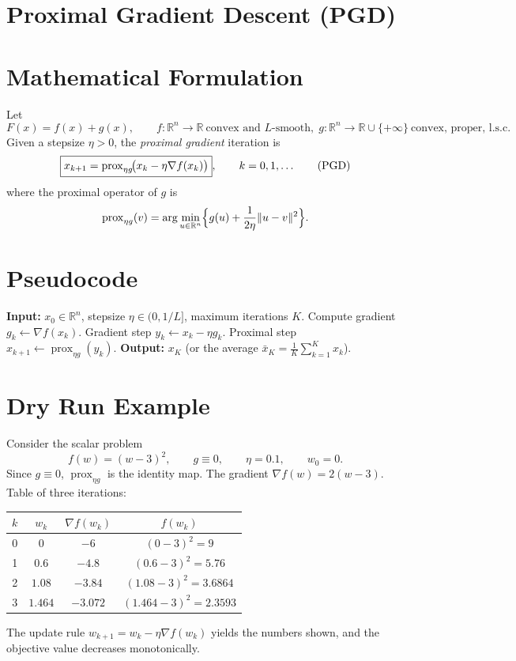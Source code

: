 \documentclass{article}
\newcommand{\prox}{\operatorname{prox}}
\newcommand{\R}{\mathbb{R}}
\begin{document}
\section*{Proximal Gradient Descent (PGD)}

\section*{Mathematical Formulation}
Let  
\[
F(x)=f(x)+g(x),\qquad f:\R^{n}\to\R\ \text{convex and }L\text{-smooth},\;
g:\R^{n}\to\R\cup\{+\infty\}\ \text{convex, proper, l.s.c.}
\]
Given a stepsize $\eta>0$, the \emph{proximal gradient} iteration is  
\[
\boxed{%
x_{k+1}= \prox_{\eta g}\!\bigl(x_{k}-\eta\nabla f(x_{k})\bigr)},\qquad k=0,1,\dots
\tag{PGD}
\]
where the proximal operator of $g$ is  
\[
\prox_{\eta g}(v)=\arg\min_{u\in\R^{n}}\Bigl\{g(u)+\frac{1}{2\eta}\|u-v\|^{2}\Bigr\}.
\]

\section*{Pseudocode}
\begin{algorithm}[H]
\caption{Proximal Gradient Descent}
\begin{algorithmic}[1]
\STATE \textbf{Input:} $x_{0}\in\R^{n}$, stepsize $\eta\in(0,1/L]$, maximum iterations $K$.
    \STATE Compute gradient $g_{k} \leftarrow \nabla f(x_{k})$.
    \STATE Gradient step $y_{k}\leftarrow x_{k}-\eta g_{k}$.
    \STATE Proximal step $x_{k+1}\leftarrow \prox_{\eta g}(y_{k})$.
\ENDFOR
\STATE \textbf{Output:} $x_{K}$ (or the average $\bar x_{K}=\frac1K\sum_{k=1}^{K}x_{k}$).
\end{algorithmic}
\end{algorithm}

\section*{Dry Run Example}
Consider the scalar problem  
\[
f(w)=(w-3)^{2},\qquad g\equiv0,\qquad \eta=0.1,\qquad w_{0}=0 .
\]
Since $g\equiv0$, $\prox_{\eta g}$ is the identity map.  
The gradient $\nabla f(w)=2(w-3)$.  Table of three iterations:

\begin{center}
\begin{tabular}{c|c|c|c}
$k$ & $w_{k}$ & $\nabla f(w_{k})$ & $f(w_{k})$\\ \hline
0 & $0$ & $-6$ & $(0-3)^{2}=9$\\
1 & $0.6$ & $-4.8$ & $(0.6-3)^{2}=5.76$\\
2 & $1.08$ & $-3.84$ & $(1.08-3)^{2}=3.6864$\\
3 & $1.464$ & $-3.072$ & $(1.464-3)^{2}=2.3593$\\
\end{tabular}
\end{center}
The update rule $w_{k+1}=w_{k}-\eta\nabla f(w_{k})$ yields the numbers shown, and the objective value decreases monotonically.
\end{document}
